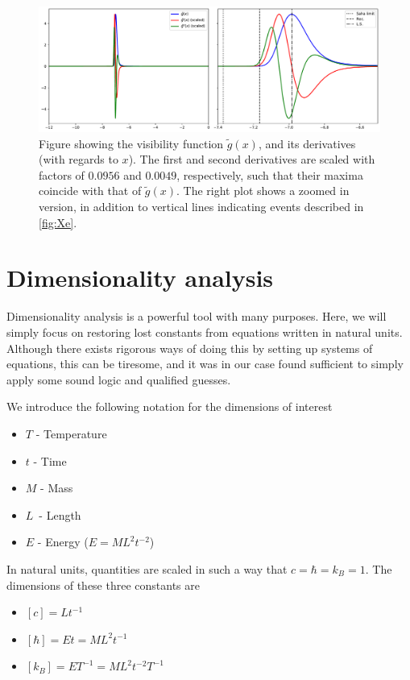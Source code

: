 \documentclass[10pt, a4paper]{article}
\begin{document}
\begin{figure}[H]
    \centering
    \includegraphics[scale=0.5]{../m2_figs/g_tilde.pdf}
    \caption{Figure showing the visibility function $\tilde{g}(x)$, and its derivatives (with regards to $x$). The first and second derivatives are scaled with factors of $0.0956$ and $0.0049$, respectively, such that their maxima coincide with that of $\tilde{g}(x)$. The right plot shows a zoomed in version, in addition to vertical lines indicating events described in \ref{fig:Xe}.}
    \label{fig:g_tilde}
\end{figure}

\appendix
\section{Dimensionality analysis}\label{sec:appendixA}
Dimensionality analysis is a powerful tool with many purposes. Here, we will simply focus on restoring lost constants from equations written in natural units. Although there exists rigorous ways of doing this by setting up systems of equations, this can be tiresome, and it was in our case found sufficient to simply apply some sound logic and qualified guesses.

We introduce the following notation for the dimensions of interest
\begin{itemize}
    \item $T$ - Temperature
    \item $t$ - Time
    \item $M$ - Mass
    \item $L$ - Length
    \item $E$ - Energy ($E = ML^2t^{-2}$)
\end{itemize}

In natural units, quantities are scaled in such a way that $c = \hbar = k_B = 1$. The dimensions of these three constants are
\begin{itemize}
    \item $[c] = Lt^{-1}$
    \item $[\hbar] = Et = ML^2t^{-1}$
    \item $[k_B] = ET^{-1} = ML^2t^{-2}T^{-1}$
\end{itemize}
\end{document}
